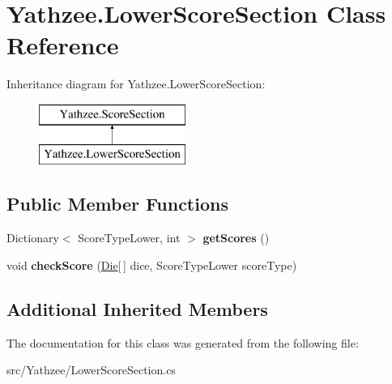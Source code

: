 \hypertarget{class_yathzee_1_1_lower_score_section}{}\section{Yathzee.\+Lower\+Score\+Section Class Reference}
\label{class_yathzee_1_1_lower_score_section}
Inheritance diagram for Yathzee.\+Lower\+Score\+Section\+:\begin{figure}[H]
\begin{center}
\leavevmode
\includegraphics[height=2.000000cm]{class_yathzee_1_1_lower_score_section}
\end{center}
\end{figure}
\subsection*{Public Member Functions}
\begin{DoxyCompactItemize}
\item 
Dictionary$<$ Score\+Type\+Lower, int $>$ {\bfseries get\+Scores} ()\hypertarget{class_yathzee_1_1_lower_score_section_a427d65a33219f4e2d4965cc56f18e1a6}{}\label{class_yathzee_1_1_lower_score_section_a427d65a33219f4e2d4965cc56f18e1a6}

\item 
void {\bfseries check\+Score} (\hyperlink{class_yathzee_1_1_die}{Die}\mbox{[}$\,$\mbox{]} dice, Score\+Type\+Lower score\+Type)\hypertarget{class_yathzee_1_1_lower_score_section_acd14498c43eb2c788e450269095a9b61}{}\label{class_yathzee_1_1_lower_score_section_acd14498c43eb2c788e450269095a9b61}

\end{DoxyCompactItemize}
\subsection*{Additional Inherited Members}


The documentation for this class was generated from the following file\+:\begin{DoxyCompactItemize}
\item 
src/\+Yathzee/Lower\+Score\+Section.\+cs\end{DoxyCompactItemize}
